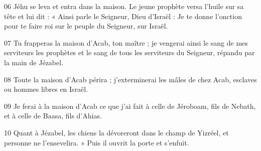 
06 Jéhu se leva et entra dans la maison. Le jeune prophète versa l’huile sur sa tête et lui dit : « Ainsi parle le Seigneur, Dieu d’Israël : Je te donne l’onction pour te faire roi sur le peuple du Seigneur, sur Israël.

07 Tu frapperas la maison d’Acab, ton maître ; je vengerai ainsi le sang de mes serviteurs les prophètes et le sang de tous les serviteurs du Seigneur, répandu par la main de Jézabel.

08 Toute la maison d’Acab périra ; j’exterminerai les mâles de chez Acab, esclaves ou hommes libres en Israël.

09 Je ferai à la maison d’Acab ce que j’ai fait à celle de Jéroboam, fils de Nebath, et à celle de Baasa, fils d’Ahias.

10 Quant à Jézabel, les chiens la dévoreront dans le champ de Yizréel, et personne ne l’ensevelira. » Puis il ouvrit la porte et s’enfuit.

